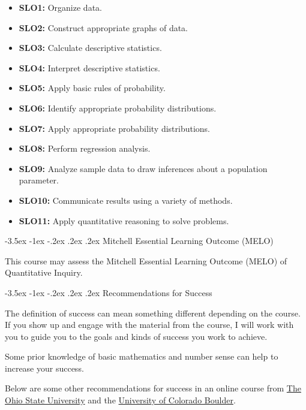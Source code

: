 \documentclass{article}
\makeatletter
\renewcommand\section{\@startsection{section}{1}{0pt}%
  {-3.5ex \@plus -1ex \@minus -.2ex}%
  {.2ex \@plus.2ex}%
  {\normalfont\Large\bfseries}} %
\makeatother
\begin{document}
\begin{itemize}
\item \textbf{SLO1:} Organize data.
\item \textbf{SLO2:} Construct appropriate graphs of data.
\item \textbf{SLO3:} Calculate descriptive statistics.
\item \textbf{SLO4:} Interpret descriptive statistics.
\item \textbf{SLO5:} Apply basic rules of probability.
\item \textbf{SLO6:} Identify appropriate probability distributions.
\item \textbf{SLO7:} Apply appropriate probability distributions.
\item \textbf{SLO8:} Perform regression analysis.
\item \textbf{SLO9:} Analyze sample data to draw inferences about a population parameter.
\item \textbf{SLO10:} Communicate results using a variety of methods.
\item \textbf{SLO11:} Apply quantitative reasoning to solve problems.
\end{itemize}

\section{Mitchell Essential Learning Outcome (MELO)}

This course may assess the Mitchell Essential Learning Outcome (MELO) of Quantitative Inquiry.

\section{Recommendations for Success}\label{recommendations-for-success}

The definition of success can mean something different depending on the course. If you show up and engage with the material from the course, I will work with you to guide you to the goals and kinds of success you work to achieve.

Some prior knowledge of basic mathematics and number sense can help to increase your success.

Below are some other recommendations for success in an online course from \href{https://online.osu.edu/resources/learn/5-online-learning-tips-student-success}{The Ohio State University} and the \href{https://www.colorado.edu/health/tips-succeeding-online-classes}{University of Colorado Boulder}.
\end{document}
